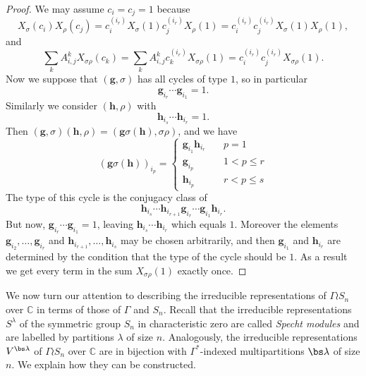 \begin{proof}
We may assume $c_i = c_j = 1$ because
\[
X_\sigma(c_i) X_\rho(c_j) = c_i^{(i_r)} X_{\sigma}(1) c_j^{(i_r)} X_{\rho} (1) = c_i^{(i_r)}c_j^{(i_r)} X_\sigma(1) X_\rho(1),
\]
and
\[
\sum_{k} A_{i,j}^k X_{\sigma\rho}(c_k) = \sum_{k} A_{i,j}^k c_k^{(i_r)} X_{\sigma\rho}(1) = c_i^{(i_r)}c_j^{(i_r)} X_{\sigma\rho}(1).
\]
Now we suppose that $(\mathbf{g}, \sigma)$ has all cycles of type $1$, so in particular
\[
\mathbf{g}_{i_r} \cdots \mathbf{g}_{i_1} = 1.
\]
Similarly we consider $(\mathbf{h}, \rho)$ with
\[
\mathbf{h}_{i_s} \cdots \mathbf{h}_{i_r} = 1.
\]
Then $(\mathbf{g}, \sigma)(\mathbf{h}, \rho) = (\mathbf{g} \sigma(\mathbf{h}), \sigma\rho)$, and we have 
\[
(\mathbf{g} \sigma(\mathbf{h}))_{i_p} =
 \left\{
        \begin{array}{ll}
            \mathbf{g}_{i_1} \mathbf{h}_{i_r} & \quad p=1 \\
            \mathbf{g}_{i_p} & \quad 1 < p \leq r \\
            \mathbf{h}_{i_p} & \quad r < p \leq s
        \end{array}
    \right.
\]
The type of this cycle is the conjugacy class of
\[
\mathbf{h}_{i_s} \cdots \mathbf{h}_{i_{r+1}} \mathbf{g}_{i_r} \cdots \mathbf{g}_{i_1}\mathbf{h}_{i_r}.
\]
But now, $\mathbf{g}_{i_r} \cdots \mathbf{g}_{i_1} = 1$, leaving $\mathbf{h}_{i_s} \cdots \mathbf{h}_{i_r}$ which equals $1$. Moreover the elements $\mathbf{g}_{i_2}, \ldots, \mathbf{g}_{i_r}$ and $\mathbf{h}_{i_{r+1}}, \ldots, \mathbf{h}_{i_s}$ may be chosen arbitrarily, and then $\mathbf{g}_{i_1}$ and $\mathbf{h}_{i_r}$ are determined by the condition that the type of the cycle should be $1$. As a result we get every term in the sum $X_{\sigma\rho}(1)$ exactly once.
\end{proof}


We now turn our attention to describing the irreducible representations of $\Gamma \wr S_n$ over $\mathbb{C}$ in terms of those of $\Gamma$ and $S_n$. Recall that the irreducible representations $S^\lambda$ of the symmetric group $S_n$ in characteristic zero are called \emph{Specht modules} and are labelled by partitions $\lambda$ of size $n$. Analogously, the irreducible representations $V^{\bs\lambda}$ of $\Gamma \wr S_n$ over $\mathbb{C}$ are in bijection with $\Gamma^*$-indexed multipartitions $\bs\lambda$ of size $n$. We explain how they can be constructed.

